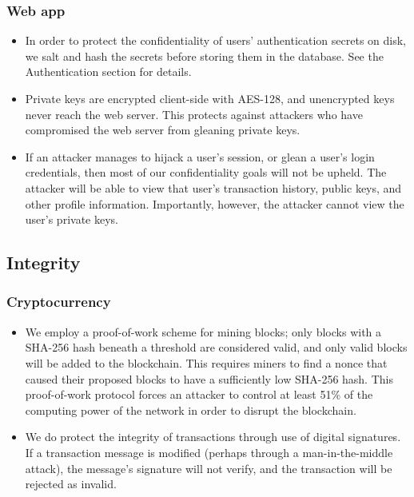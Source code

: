 \documentclass[12pt]{article}
\begin{document}
\subsubsection*{Web app}

\begin{itemize}
	\item In order to protect the confidentiality of users' authentication secrets on disk, we salt and hash the secrets before storing them in the database.
	See the Authentication section for details.
	\item Private keys are encrypted client-side with AES-128, and unencrypted keys never reach the web server.
	This protects against attackers who have compromised the web server from gleaning private keys.
	\item If an attacker manages to hijack a user's session, or glean a user's login credentials, then most of our confidentiality goals will not be upheld.
	The attacker will be able to view that user's transaction history, public keys, and other profile information.
	Importantly, however, the attacker cannot view the user's private keys.
\end{itemize}

\subsection{Integrity}

\subsubsection*{Cryptocurrency}

\begin{itemize}
	\item We employ a proof-of-work scheme for mining blocks; only blocks with a SHA-256 hash beneath a threshold are considered valid, and only valid blocks will be added to the blockchain.
	This requires miners to find a nonce that caused their proposed blocks to have a sufficiently low SHA-256 hash.
	This proof-of-work protocol forces an attacker to control at least 51\% of the computing power of the network in order to disrupt the blockchain\cite{bitcoin}.
	\item We do protect the integrity of transactions through use of digital signatures.
	If a transaction message is modified (perhaps through a man-in-the-middle attack), the message's signature will not verify, and the transaction will be rejected as invalid.
\end{itemize}
\end{document}

